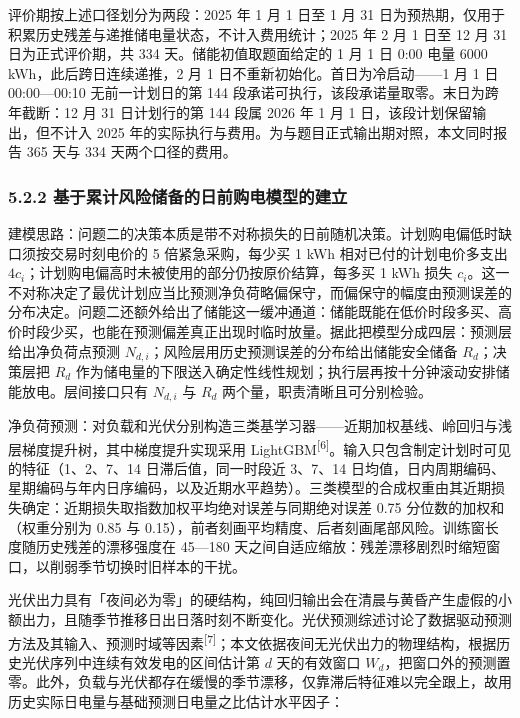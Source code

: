 \documentclass[12pt,a4paper]{ctexart}
\begin{document}
评价期按上述口径划分为两段：2025 年 1 月 1 日至 1 月 31 日为预热期，仅用于积累历史残差与递推储电量状态，不计入费用统计；2025 年 2 月 1 日至 12 月 31 日为正式评价期，共 334 天。储能初值取题面给定的 1 月 1 日 0:00 电量 6000 kWh，此后跨日连续递推，2 月 1 日不重新初始化。首日为冷启动——1 月 1 日 00:00—00:10 无前一计划日的第 144 段承诺可执行，该段承诺量取零。末日为跨年截断：12 月 31 日计划行的第 144 段属 2026 年 1 月 1 日，该段计划保留输出，但不计入 2025 年的实际执行与费用。为与题目正式输出期对照，本文同时报告 365 天与 334 天两个口径的费用。

\subsubsection*{5.2.2 基于累计风险储备的日前购电模型的建立}

建模思路：问题二的决策本质是带不对称损失的日前随机决策。计划购电偏低时缺口须按交易时刻电价的 5 倍紧急采购，每少买 1 kWh 相对已付的计划电价多支出 $4c_i$；计划购电偏高时未被使用的部分仍按原价结算，每多买 1 kWh 损失 $c_i$。这一不对称决定了最优计划应当比预测净负荷略偏保守，而偏保守的幅度由预测误差的分布决定。问题二还额外给出了储能这一缓冲通道：储能既能在低价时段多买、高价时段少买，也能在预测偏差真正出现时临时放量。据此把模型分成四层：预测层给出净负荷点预测 $N_{d,i}$；风险层用历史预测误差的分布给出储能安全储备 $R_d$；决策层把 $R_d$ 作为储电量的下限送入确定性线性规划；执行层再按十分钟滚动安排储能放电。层间接口只有 $N_{d,i}$ 与 $R_d$ 两个量，职责清晰且可分别检验。

净负荷预测：对负载和光伏分别构造三类基学习器——近期加权基线、岭回归与浅层梯度提升树，其中梯度提升实现采用 LightGBM\textsuperscript{[6]}。输入只包含制定计划时可见的特征（1、2、7、14 日滞后值，同一时段近 3、7、14 日均值，日内周期编码、星期编码与年内日序编码，以及近期水平趋势）。三类模型的合成权重由其近期损失确定：近期损失取指数加权平均绝对误差与同期绝对误差 0.75 分位数的加权和（权重分别为 0.85 与 0.15），前者刻画平均精度、后者刻画尾部风险。训练窗长度随历史残差的漂移强度在 45—180 天之间自适应缩放：残差漂移剧烈时缩短窗口，以削弱季节切换时旧样本的干扰。

光伏出力具有「夜间必为零」的硬结构，纯回归输出会在清晨与黄昏产生虚假的小额出力，且随季节推移日出日落时刻不断变化。光伏预测综述讨论了数据驱动预测方法及其输入、预测时域等因素\textsuperscript{[7]}；本文依据夜间无光伏出力的物理结构，根据历史光伏序列中连续有效发电的区间估计第 $d$ 天的有效窗口 $W_d$，把窗口外的预测置零。此外，负载与光伏都存在缓慢的季节漂移，仅靠滞后特征难以完全跟上，故用历史实际日电量与基础预测日电量之比估计水平因子：
\end{document}
